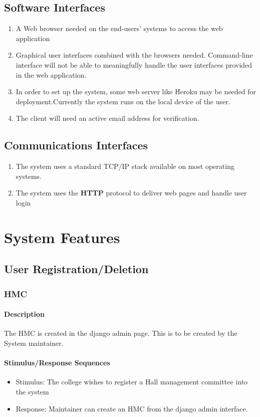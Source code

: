 \documentclass{scrreprt}
\begin{document}
\section{Software Interfaces}
\begin{enumerate}
    \item A Web browser needed on the end-users' systems to access the web application
    \item Graphical user interfaces combined with the browsers needed. Command-line interface will not be able to meaningfully handle the user interfaces provided in the web application.
    \item In order to set up the system, some web server like Heroku may be needed for deployment.Currently the system runs on the local device of the user.
    \item The client will need an active email address for verification.
\end{enumerate}
\section{Communications Interfaces}
\begin{enumerate}
    \item The system uses a standard TCP/IP stack available on most operating systems.
    \item The system uses the \textbf{HTTP} protocol to deliver web pages and handle user login
\end{enumerate}

\chapter{System Features}

\section{User Registration/Deletion}
\subsection{HMC}
\subsubsection{Description}
    The HMC is created in the django admin page. This is to be created by the System maintainer.
\subsubsection{Stimulus/Response Sequences}
\begin{itemize}
    \item Stimulus: The college wishes to register a Hall management committee into the system
    \item Response: Maintainer can create an HMC from the django admin interface.
\end{itemize}
\end{document}

